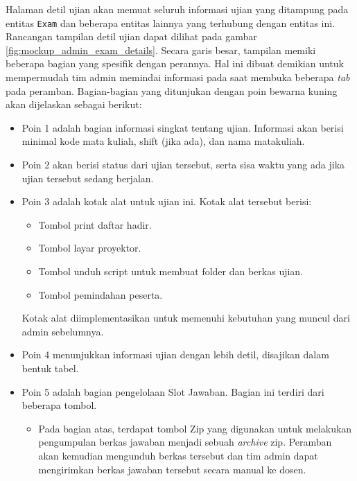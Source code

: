     Halaman detil ujian akan memuat seluruh informasi ujian yang ditampung pada entitas \texttt{Exam} dan
    beberapa entitas lainnya yang terhubung dengan entitas ini. Rancangan tampilan detil ujian dapat
    dilihat pada gambar \ref{fig:mockup_admin_exam_details}. Secara garis besar, tampilan memiki beberapa
    bagian yang spesifik dengan perannya. Hal ini dibuat demikian untuk mempermudah tim admin memindai
    informasi pada saat membuka beberapa \textit{tab} pada peramban. Bagian-bagian yang ditunjukan dengan
    poin bewarna kuning akan dijelaskan sebagai berikut:
    \begin{itemize}
        \item Poin 1 adalah bagian informasi singkat tentang ujian. Informasi akan berisi minimal
            kode mata kuliah, shift (jika ada), dan nama matakuliah.
            
        \item Poin 2 akan berisi status dari ujian tersebut, serta sisa waktu yang ada jika ujian tersebut 
            sedang berjalan.
            
        \item Poin 3 adalah kotak alat untuk ujian ini. Kotak alat tersebut berisi:
            \begin{itemize}
                \item Tombol print daftar hadir.
                \item Tombol layar proyektor.
                \item Tombol unduh script untuk membuat folder dan berkas ujian.
                \item Tombol pemindahan peserta.
            \end{itemize}
            Kotak alat diimplementasikan untuk memenuhi kebutuhan yang muncul dari admin sebelumnya.
            
        \item Poin 4 menunjukkan informasi ujian dengan lebih detil, disajikan dalam bentuk tabel.
        
        \item Poin 5 adalah bagian pengelolaan Slot Jawaban. Bagian ini terdiri dari beberapa tombol.
            \begin{itemize}
                \item Pada bagian atas, terdapat tombol Zip yang digunakan untuk melakukan pengumpulan berkas
                    jawaban menjadi sebuah \textit{archive} zip. Peramban akan kemudian mengunduh berkas tersebut
                    dan tim admin dapat mengirimkan berkas jawaban tersebut secara manual ke dosen.
                    

\end{itemize}
\end{itemize}
